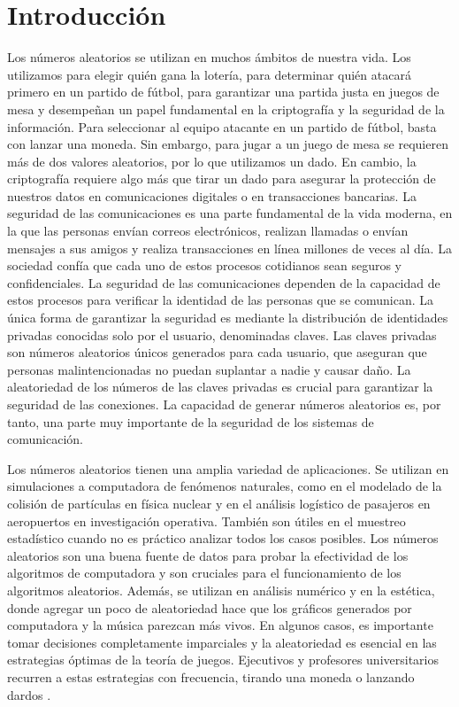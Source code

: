 \chapter{Introducción}

    Los números aleatorios se utilizan en muchos ámbitos de nuestra vida. Los utilizamos para elegir quién gana la lotería, para determinar quién atacará primero en un partido de fútbol, para garantizar una partida justa en juegos de mesa y desempeñan un papel fundamental en la criptografía y la seguridad de la información. Para seleccionar al equipo atacante en un partido de fútbol, basta con lanzar una moneda. Sin embargo, para jugar a un juego de mesa se requieren más de dos valores aleatorios, por lo que utilizamos un dado. En cambio, la criptografía requiere algo más que tirar un dado para asegurar la protección de nuestros datos en comunicaciones digitales o en transacciones bancarias. La seguridad de las comunicaciones es una parte fundamental de la vida moderna, en la que las personas envían correos electrónicos, realizan llamadas o envían mensajes a sus amigos y realiza transacciones en línea millones de veces al día. La sociedad confía que cada uno de estos procesos cotidianos sean seguros y confidenciales. La seguridad de las comunicaciones dependen de la capacidad de estos procesos para verificar la identidad de las personas que se comunican. La única forma de garantizar la seguridad es mediante la distribución de identidades privadas conocidas solo por el usuario, denominadas claves. Las claves privadas son números aleatorios únicos generados para cada usuario, que aseguran que personas malintencionadas no puedan suplantar a nadie y causar daño. La aleatoriedad de los números de las claves privadas es crucial para garantizar la seguridad de las conexiones. La capacidad de generar números aleatorios es, por tanto, una parte muy importante de la seguridad de los sistemas de comunicación.

    Los números aleatorios tienen una amplia variedad de aplicaciones. Se utilizan en simulaciones a computadora de fenómenos naturales, como en el modelado de la colisión de partículas en física nuclear y en el análisis logístico de pasajeros en aeropuertos en investigación operativa. También son útiles en el muestreo estadístico cuando no es práctico analizar todos los casos posibles. Los números aleatorios son una buena fuente de datos para probar la efectividad de los algoritmos de computadora y son cruciales para el funcionamiento de los algoritmos aleatorios. Además, se utilizan en análisis numérico y en la estética, donde agregar un poco de aleatoriedad hace que los gráficos generados por computadora y la música parezcan más vivos. En algunos casos, es importante tomar decisiones completamente imparciales y la aleatoriedad es esencial en las estrategias óptimas de la teoría de juegos. Ejecutivos y profesores universitarios recurren a estas estrategias con frecuencia, tirando una moneda o lanzando dardos \cite{Knuth2014}. 

